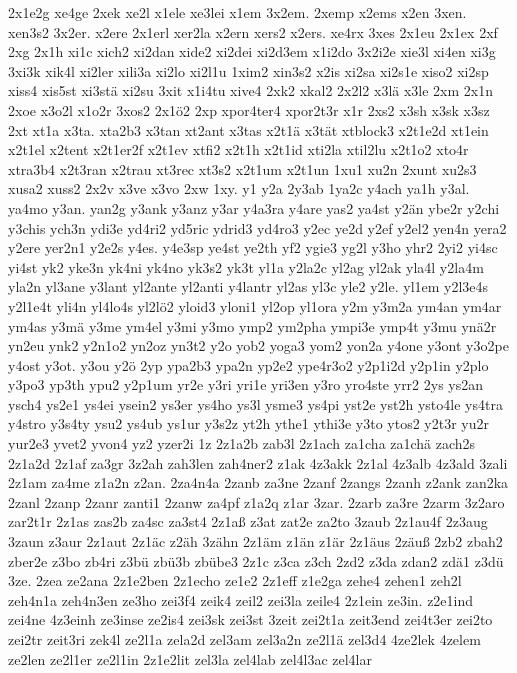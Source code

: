 {2x1e2g
xe4ge
2xek
xe2l
x1ele
xe3lei
x1em
3x2em.
2xemp
x2ems
x2en
3xen.
xen3s2
3x2er.
x2ere
2x1erl
xer2la
x2ern
xers2
x2ers.
xe4rx
3xes
2x1eu
2x1ex
2xf
2xg
2x1h
xi1c
xich2
xi2dan
xide2
xi2dei
xi2d3em
x1i2do
3x2i2e
xie3l
xi4en
xi3g
3xi3k
xik4l
xi2ler
xili3a
xi2lo
xi2l1u
1xim2
xin3s2
x2is
xi2sa
xi2s1e
xiso2
xi2sp
xiss4
xis5st
xi3stä
xi2su
3xit
x1i4tu
xive4
2xk2
xkal2
2x2l2
x3lä
x3le
2xm
2x1n
2xoe
x3o2l
x1o2r
3xos2
2x1ö2
2xp
xpor4ter4
xpor2t3r
x1r
2xs2
x3sh
x3sk
x3sz
2xt
xt1a
x3ta.
xta2b3
x3tan
xt2ant
x3tas
x2t1ä
x3tät
xtblock3
x2t1e2d
xt1ein
x2t1el
x2tent
x2t1er2f
x2t1ev
xtfi2
x2t1h
x2t1id
xti2la
xtil2lu
x2t1o2
xto4r
xtra3b4
x2t3ran
x2trau
xt3rec
xt3s2
x2t1um
x2t1un
1xu1
xu2n
2xunt
xu2s3
xusa2
xuss2
2x2v
x3ve
x3vo
2xw
1xy.
y1
y2a
2y3ab
1ya2c
y4ach
ya1h
y3al.
ya4mo
y3an.
yan2g
y3ank
y3anz
y3ar
y4a3ra
y4are
yas2
ya4st
y2än
ybe2r
y2chi
y3chis
ych3n
ydi3e
yd4ri2
yd5ric
ydrid3
yd4ro3
y2ec
ye2d
y2ef
y2el2
yen4n
yera2
y2ere
yer2n1
y2e2s
y4es.
y4e3sp
ye4st
ye2th
yf2
ygie3
yg2l
y3ho
yhr2
2yi2
yi4sc
yi4st
yk2
yke3n
yk4ni
yk4no
yk3s2
yk3t
yl1a
y2la2c
yl2ag
yl2ak
yla4l
y2la4m
yla2n
yl3ane
y3lant
yl2ante
yl2anti
y4lantr
yl2as
yl3c
yle2
y2le.
yl1em
y2l3e4s
y2l1e4t
yli4n
yl4lo4s
yl2lö2
yloid3
yloni1
yl2op
yl1ora
y2m
y3m2a
ym4an
ym4ar
ym4as
y3mä
y3me
ym4el
y3mi
y3mo
ymp2
ym2pha
ympi3e
ymp4t
y3mu
ynä2r
yn2eu
ynk2
y2n1o2
yn2oz
yn3t2
y2o
yob2
yoga3
yom2
yon2a
y4one
y3ont
y3o2pe
y4ost
y3ot.
y3ou
y2ö
2yp
ypa2b3
ypa2n
yp2e2
ype4r3o2
y2p1i2d
y2p1in
y2plo
y3po3
yp3th
ypu2
y2p1um
yr2e
y3ri
yri1e
yri3en
y3ro
yro4ste
yrr2
2ys
ys2an
ysch4
ys2e1
ys4ei
ysein2
ys3er
ys4ho
ys3l
ysme3
ys4pi
yst2e
yst2h
ysto4le
ys4tra
y4stro
y3s4ty
ysu2
ys4ub
ys1ur
y3s2z
yt2h
ythe1
ythi3e
y3to
ytos2
y2t3r
yu2r
yur2e3
yvet2
yvon4
yz2
yzer2i
1z
2z1a2b
zab3l
2z1ach
za1cha
za1chä
zach2s
2z1a2d
2z1af
za3gr
3z2ah
zah3len
zah4ner2
z1ak
4z3akk
2z1al
4z3alb
4z3ald
3zali
2z1am
za4me
z1a2n
z2an.
2za4n4a
2zanb
za3ne
2zanf
2zangs
2zanh
z2ank
zan2ka
2zanl
2zanp
2zanr
zanti1
2zanw
za4pf
z1a2q
z1ar
3zar.
2zarb
za3re
2zarm
3z2aro
zar2t1r
2z1as
zas2b
za4sc
za3st4
2z1aß
z3at
zat2e
za2to
3zaub
2z1au4f
2z3aug
3zaun
z3aur
2z1aut
2z1äc
z2äh
3zähn
2z1äm
z1än
z1är
2z1äus
2zäuß
2zb2
zbah2
zber2e
z3bo
zb4ri
z3bü
zbü3b
zbübe3
2z1c
z3ca
z3ch
2zd2
z3da
zdan2
zdä1
z3dü
3ze.
2zea
ze2ana
2z1e2ben
2z1echo
ze1e2
2z1eff
z1e2ga
zehe4
zehen1
zeh2l
zeh4n1a
zeh4n3en
ze3ho
zei3f4
zeik4
zeil2
zei3la
zeile4
2z1ein
ze3in.
z2e1ind
zei4ne
4z3einh
ze3inse
ze2is4
zei3sk
zei3st
3zeit
zei2t1a
zeit3end
zei4t3er
zei2to
zei2tr
zeit3ri
zek4l
ze2l1a
zela2d
zel3am
zel3a2n
ze2l1ä
zel3d4
4ze2lek
4zelem
ze2len
ze2l1er
ze2l1in
2z1e2lit
zel3la
zel4lab
zel4l3ac
zel4lar
}
